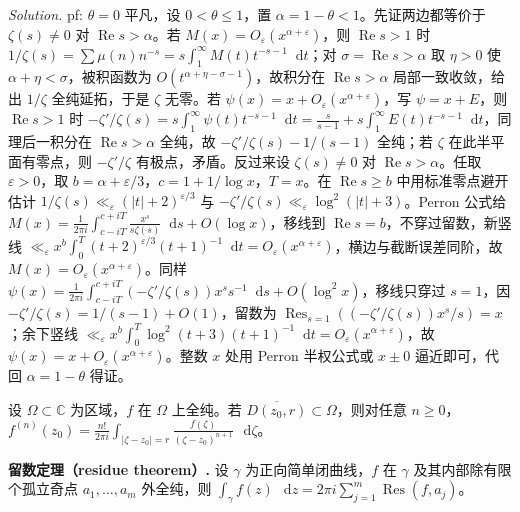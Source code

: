 \documentclass[
	colors = true,
	geometry = b5,
	fontsetup = font-setup-overleaf.tex,
	titlesetup = titles-setup.tex
]{AJbook}
\newenvironment{solution}{%
	\par\smallskip
	\noindent\textit{Solution.}\enspace
}{%
	\par\smallskip
}
\providecommand{\dd}{\mathop{}\!\mathrm d}
\begin{document}
\begin{solution}pf: $\theta=0$ 平凡，设 $0<\theta\leq1$，置 $\alpha=1-\theta<1$。先证两边都等价于 $\zeta(s)\neq0$ 对 $\operatorname{Re}s>\alpha$。若 $M(x)=O_\varepsilon(x^{\alpha+\varepsilon})$，则 $\operatorname{Re}s>1$ 时 $1/\zeta(s)=\sum\mu(n)n^{-s}=s\int_1^\infty M(t)t^{-s-1}\dd t$；对 $\sigma=\operatorname{Re}s>\alpha$ 取 $\eta>0$ 使 $\alpha+\eta<\sigma$，被积函数为 $O(t^{\alpha+\eta-\sigma-1})$，故积分在 $\operatorname{Re}s>\alpha$ 局部一致收敛，给出 $1/\zeta$ 全纯延拓，于是 $\zeta$ 无零。若 $\psi(x)=x+O_\varepsilon(x^{\alpha+\varepsilon})$，写 $\psi=x+E$，则 $\operatorname{Re}s>1$ 时 $-\zeta'/\zeta(s)=s\int_1^\infty\psi(t)t^{-s-1}\dd t=\frac{s}{s-1}+s\int_1^\infty E(t)t^{-s-1}\dd t$，同理后一积分在 $\operatorname{Re}s>\alpha$ 全纯，故 $-\zeta'/\zeta(s)-1/(s-1)$ 全纯；若 $\zeta$ 在此半平面有零点，则 $-\zeta'/\zeta$ 有极点，矛盾。反过来设 $\zeta(s)\neq0$ 对 $\operatorname{Re}s>\alpha$。任取 $\varepsilon>0$，取 $b=\alpha+\varepsilon/3$，$c=1+1/\log x$，$T=x$。在 $\operatorname{Re}s\geq b$ 中用标准零点避开估计 $1/\zeta(s)\ll_\varepsilon(|t|+2)^{\varepsilon/3}$ 与 $-\zeta'/\zeta(s)\ll_\varepsilon\log^2(|t|+3)$。Perron 公式给 $M(x)=\frac1{2\pi i}\int_{c-iT}^{c+iT}\frac{x^s}{s\zeta(s)}\dd s+O(\log x)$，移线到 $\operatorname{Re}s=b$，不穿过留数，新竖线 $\ll_\varepsilon x^b\int_0^T(t+2)^{\varepsilon/3}(t+1)^{-1}\dd t=O_\varepsilon(x^{\alpha+\varepsilon})$，横边与截断误差同阶，故 $M(x)=O_\varepsilon(x^{\alpha+\varepsilon})$。同样 $\psi(x)=\frac1{2\pi i}\int_{c-iT}^{c+iT}(-\zeta'/\zeta(s))x^s s^{-1}\dd s+O(\log^2x)$，移线只穿过 $s=1$，因 $-\zeta'/\zeta(s)=1/(s-1)+O(1)$，留数为 $\operatorname{Res}_{s=1}((-\zeta'/\zeta(s))x^s/s)=x$；余下竖线 $\ll_\varepsilon x^b\int_0^T\log^2(t+3)(t+1)^{-1}\dd t=O_\varepsilon(x^{\alpha+\varepsilon})$，故 $\psi(x)=x+O_\varepsilon(x^{\alpha+\varepsilon})$。整数 $x$ 处用 Perron 半权公式或 $x\pm0$ 逼近即可，代回 $\alpha=1-\theta$ 得证。\end{solution}
\begin{proposition}
设 $\Omega\subset\mathbb C$ 为区域，$f$ 在 $\Omega$ 上全纯。若 $\overline{D(z_0,r)}\subset\Omega$，则对任意 $n\geq0$，$f^{(n)}(z_0)=\frac{n!}{2\pi i}\int_{|\zeta-z_0|=r}\frac{f(\zeta)}{(\zeta-z_0)^{n+1}}\,\dd\zeta$。
\end{proposition}

\noindent\textbf{留数定理（residue theorem）.} 设 $\gamma$ 为正向简单闭曲线，$f$ 在 $\gamma$ 及其内部除有限个孤立奇点 $a_1,\ldots,a_m$ 外全纯，则 $\int_\gamma f(z)\,\dd z=2\pi i\sum_{j=1}^m \operatorname{Res}(f,a_j)$。
\end{document}
